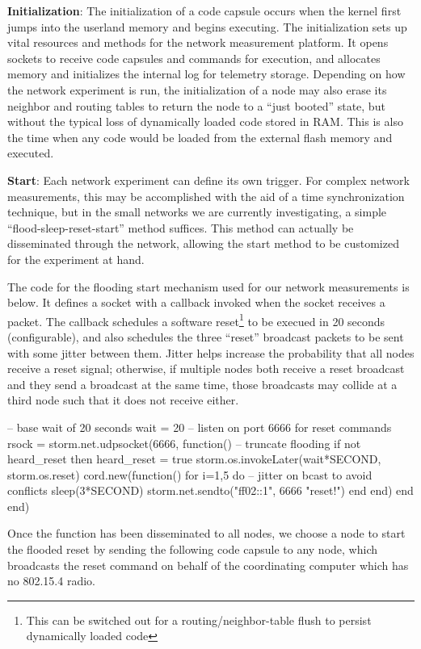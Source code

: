 \textbf{Initialization}: The initialization of a code capsule occurs when the kernel first jumps into the userland memory and begins executing.
The initialization sets up vital resources and methods for the network measurement platform.
It opens sockets to receive code capsules and commands for execution, and allocates memory and initializes the internal log for telemetry storage.
Depending on how the network experiment is run, the initialization of a node may also erase its neighbor and routing tables to return the node to a ``just booted'' state, but without the typical loss of dynamically loaded code stored in RAM.
This is also the time when any code would be loaded from the external flash memory and executed.

\textbf{Start}: Each network experiment can define its own trigger.
For complex network measurements, this may be accomplished with the aid of a time synchronization technique, but in the small networks we are currently investigating, a simple ``flood-sleep-reset-start'' method suffices.
This method can actually be disseminated through the network, allowing the start method to be customized for the experiment at hand.

The code for the flooding start mechanism used for our network measurements is below.
It defines a socket with a callback invoked when the socket receives a packet.
The callback schedules a software reset\footnote{This can be switched out for a routing/neighbor-table flush to persist dynamically loaded code} to be execued in 20 seconds (configurable), and also schedules the three ``reset'' broadcast packets to be sent with some jitter between them.
Jitter helps increase the probability that all nodes receive a reset signal; otherwise, if multiple nodes both receive a reset broadcast and they send a broadcast at the same time, those broadcasts may collide at a third node such that it does not receive either.

\begin{luacode}
-- base wait of 20 seconds
wait = 20
-- listen on port 6666 for reset commands
rsock = storm.net.udpsocket(6666, function()
 -- truncate flooding
 if not heard_reset then
  heard_reset = true
  storm.os.invokeLater(wait*SECOND, storm.os.reset)
  cord.new(function()
   for i=1,5 do
    -- jitter on bcast to avoid conflicts
    sleep(3*SECOND)
    storm.net.sendto("ff02::1", 6666 "reset!")
   end
  end)
 end
end)
\end{luacode}

Once the function has been disseminated to all nodes, we choose a node to start the flooded reset by sending the following code capsule to any node, which broadcasts the reset command on behalf of the coordinating computer which has no 802.15.4 radio.

